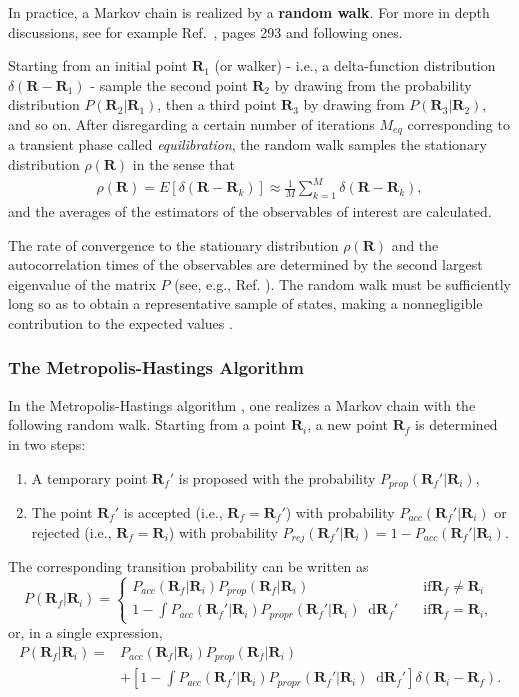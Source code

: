 \documentclass[twoside,english]{uiofysmaster}
\newcommand*\dif{\mathop{}\!\mathrm{d}}
\begin{document}
In practice, a Markov chain is realized by a \textbf{random walk}. For more in depth discussions,
see for example Ref.~\cite{Toulouse2016},  pages 293 and following ones.

Starting from an initial point $\bm{R}_1$ (or walker) - i.e., a
delta-function distribution $\delta (\bm{R} - \bm{R}_1)$ - sample the
second point $\bm{R}_2$ by drawing from the probability distribution
$P(\bm{R}_2|\bm{R}_1)$, then a third point $\bm{R}_3$ by drawing from
$P(\bm{R}_3 | \bm{R}_2)$, and so on. After disregarding a certain
number of iterations $M_{eq}$ corresponding to a transient phase
called \textit{equilibration}, the random walk samples the stationary
distribution $\rho(\bm{R})$ in the sense that
\begin{align}
	\rho(\bm{R}) = E[\delta (\bm{R} - \bm{R}_k) ] \approx \frac{1}{M} \sum_{k=1}^M \delta (\bm{R} - \bm{R}_k),
\end{align}
and the averages of the estimators of the observables of interest are calculated.

The rate of convergence to the stationary distribution $\rho(\bm{R})$
and the autocorrelation times of the observables are determined by the
second largest eigenvalue of the matrix $P$ (see, e.g.,
Ref. \cite{Gilks1996}). The random walk must be sufficiently long so
as to obtain a representative sample of states, making a nonnegligible
contribution to the expected values \cite{Toulouse2016}.

\subsubsection{The Metropolis-Hastings Algorithm}
In the Metropolis-Hastings algorithm , one realizes a Markov chain
with the following random walk. Starting from a point $\bm{R}_i$, a
new point $\bm{R}_f$ is determined in two steps:
\begin{enumerate}
	\item A temporary point $\bm{R}_f'$ is proposed with the probability $P_{prop} (\bm{R}_f' | \bm{R}_i)$,
	\item The point $\bm{R}_f'$ is accepted (i.e., $\bm{R}_f = \bm{R}_f'$) with probability $P_{acc} (\bm{R}_f' | \bm{R}_i)$ or rejected (i.e., $\bm{R}_f = \bm{R}_i$) with probability $P_{rej}(\bm{R}_f' | \bm{R}_i) = 1 - P_{acc} (\bm{R}_f' | \bm{R}_i)$.
\end{enumerate}
The corresponding transition probability can be written as
\[ P(\bm{R}_f |\bm{R}_i ) = \begin{cases}
				P_{acc}(\bm{R}_f |\bm{R}_i ) P_{prop} (\bm{R}_f |\bm{R}_i )  
				& \quad \text{if} \bm{R}_f \neq \bm{R}_i \\
				1 - \int  P_{acc}(\bm{R}_f' |\bm{R}_i ) P_{propr} (\bm{R}_f' |\bm{R}_i )  \dif \bm{R}_f'
				& \quad \text{if} \bm{R}_f = \bm{R}_i,  
\end{cases} \]
or, in a single expression,
\begin{align}
	P(\bm{R}_f |\bm{R}_i ) =& P_{acc}(\bm{R}_f |\bm{R}_i ) P_{prop} (\bm{R}_f |\bm{R}_i ) \\
	&+ [1-\int  P_{acc}(\bm{R}_f' |\bm{R}_i ) P_{propr} (\bm{R}_f' |\bm{R}_i )  \dif \bm{R}_f'] \delta(\bm{R}_i - \bm{R}_f).
\end{align}
\end{document}
